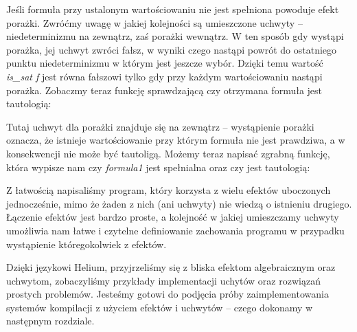 Jeśli formuła przy ustalonym wartościowaniu nie jest spełniona powoduje efekt porażki. Zwróćmy uwagę w jakiej kolejności są umieszczone uchwyty -- niedeterminizmu na zewnątrz, zaś porażki wewnątrz. W ten sposób gdy wystąpi porażka, jej uchwyt zwróci fałsz, w wyniki czego nastąpi powrót do ostatniego punktu niedeterminizmu w którym jest jeszcze wybór. Dzięki temu wartość \textit{is\_sat f} jest równa fałszowi tylko gdy przy każdym wartościowaniu nastąpi porażka. Zobaczmy teraz funkcję sprawdzającą czy otrzymana formuła jest tautologią:



Tutaj uchwyt dla porażki znajduje się na zewnątrz -- wystąpienie porażki oznacza, że istnieje wartościowanie przy którym formuła nie jest prawdziwa, a w konsekwencji nie może być tautoligą. Możemy teraz napisać zgrabną funkcję, która wypisze nam czy \textit{formula1} jest spełnialna oraz czy jest tautologią:



Z łatwością napisaliśmy program, który korzysta z wielu efektów uboczonych jednocześnie, mimo że żaden z nich (ani uchwyty) nie wiedzą o istnieniu drugiego. Łączenie efektów jest bardzo proste, a kolejność w jakiej umieszczamy uchwyty umożliwia nam łatwe i czytelne definiowanie zachowania programu w przypadku wystąpienie któregokolwiek z efektów.

Dzięki językowi Helium, przyjrzeliśmy się z bliska efektom algebraicznym oraz uchwytom, zobaczyliśmy przykłady implementacji uchytów oraz rozwiązań prostych problemów. Jesteśmy gotowi do podjęcia próby zaimplementowania systemów kompilacji z użyciem efektów i uchwytów -- czego dokonamy w następnym rozdziale.

